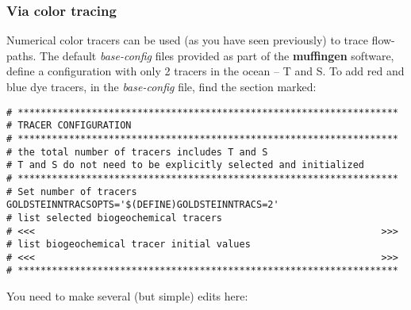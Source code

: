 \documentclass[11pt,fleqn]{book} %
\begin{document}
\subsubsection{Via color tracing}

Numerical color tracers can be used (as you have seen previously) to trace flow-paths. The default \textit{base-config} files provided as part of the \textbf{muffingen} software, define a configuration with only 2 tracers in the ocean -- T and S. To add red and blue dye tracers, in the \textit{base-config} file, find the section marked:

\footnotesize\vspace{-2pt}\begin{verbatim}
# *******************************************************************
# TRACER CONFIGURATION
# *******************************************************************
# the total number of tracers includes T and S
# T and S do not need to be explicitly selected and initialized
# *******************************************************************
# Set number of tracers
GOLDSTEINNTRACSOPTS='$(DEFINE)GOLDSTEINNTRACS=2'
# list selected biogeochemical tracers
# <<<                                                             >>>
# list biogeochemical tracer initial values
# <<<                                                             >>>
# *******************************************************************
\end{verbatim}\vspace{-2pt}\normalsize

\noindent You need to make several (but simple) edits here:
\end{document}
